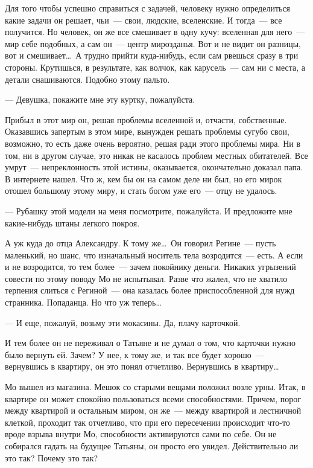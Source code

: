 Для того чтобы успешно справиться с задачей, человеку нужно определиться какие 
задачи он решает, чьи~--- свои, людские, вселенские. И тогда~--- все 
получится. Но 
человек, он же все смешивает в одну кучу: вселенная для него~--- мир себе 
подобных, а сам он~--- центр мирозданья. Вот и не видит он разницы, вот и 
смешивает\ldots\ А трудно прийти куда-нибудь, если сам рвешься сразу в три 
стороны. 
Крутишься, в результате, как волчок, как карусель~--- сам ни с места, а детали 
снашиваются. Подобно этому пальто.


\noindent ---  Девушка, покажите мне эту куртку, пожалуйста.



Прибыл в этот мир он, решая проблемы вселенной и, отчасти, собственные. 
Оказавшись запертым в этом мире, вынужден решать проблемы сугубо свои, 
возможно, 
то есть даже очень вероятно, решая ради этого проблемы мира. Ни в том, ни в 
другом случае, это никак не касалось проблем местных обитателей. Все умрут~--- 
непреклонность этой истины, оказывается, окончательно доказал папа. В интернете 
нашел. Что ж, кем бы он на самом деле ни был, но его мирок отошел большому 
этому 
миру, и стать богом уже его~--- отцу не удалось.


\noindent ---  Рубашку этой модели на меня посмотрите, пожалуйста. И предложите мне 
какие-нибудь штаны легкого покроя.



А уж куда до отца Александру. К тому же\ldots\ Он говорил Регине~--- пусть 
маленький, 
но шанс, что изначальный носитель тела возродится~--- есть. А если и не 
возродится, то тем более~--- зачем покойнику деньги. Никаких угрызений совести 
по 
этому поводу Мо не испытывал. Разве что жалел, что не хватило терпения слиться 
с 
Региной~--- она казалась более приспособленной для нужд странника. Попаданца. 
Но 
что уж теперь\ldots



\noindent ---  И еще, пожалуй, возьму эти мокасины. Да, плачу карточкой.



И тем более он не переживал о Татьяне и не думал о том, что карточки нужно было 
вернуть ей. Зачем? У нее, к тому же, и так все будет хорошо~--- вернувшись в 
квартиру, он это понял отчетливо. Вернувшись в квартиру\ldots

Мо вышел из магазина. Мешок со старыми вещами положил возле урны. Итак, в 
квартире он может спокойно пользоваться всеми способностями. Причем, порог 
между 
квартирой и остальным миром, он же~--- между квартирой и лестничной клеткой, 
проходит так отчетливо, что при его пересечении происходит что-то вроде взрыва 
внутри Мо, способности активируются сами по себе. Он не собирался гадать на 
будущее Татьяны, он просто его увидел. Действительно ли это так? Почему это так?



